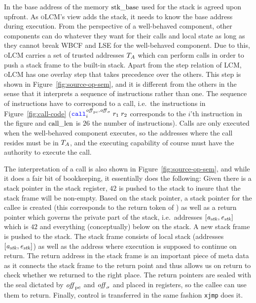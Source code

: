 \documentclass[acmsmall,review,anonymous]{acmart}\settopmatter{printfolios=true,printccs=false,printacmref=false}
\newcommand{\trgcm}{\textsc{LCM}}
\newcommand{\srccm}{\textsc{oLCM}}
\begin{document}
In \stktokens{} the base address of the memory $\mathrm{stk\_base}$ used for the stack is agreed upon upfront.
As \srccm{}'s view adds the stack, it needs to know the base address during execution.
From the perspective of a well-behaved component, other components can do whatever they want for their calls and local state as long as they cannot break WBCF and LSE for the well-behaved component.
Due to this, \srccm{} carries a set of trusted addresses $T_{A}$ which can perform calls in order to push a stack frame to the built-in stack.
Apart from the step relation of \trgcm{}, \srccm{} has one overlay step that takes precedence over the others.
This step is shown in Figure~\ref{fig:source-op-sem}, and it is different from the others in the sense that it interprets a sequence of instructions rather than one.
The sequence of instructions have to correspond to a call, i.e.\ the instructions in Figure~\ref{fig:call-code} ($\scall[i]{\offpc,\offsigma}{r_1}{r_2}$ corresponds to the $i$'th instruction in the figure and $\mathrm{call\_len}$ is $26$ the number of instructions).
Calls are only executed when the well-behaved component executes, so the addresses where the call resides must be in $T_{A}$, and the executing capability of course must have the authority to execute the call.

The interpretation of a call is also shown in Figure~\ref{fig:source-op-sem}, and while it does a fair bit of bookkeeping, it essentially does the following: Given there is a stack pointer in the stack register, $42$ is pushed to the stack to insure that the stack frame will be non-empty. Based on the stack pointer, a stack pointer for the callee is created (this corresponds to the return token of \stktokens{}) as well as a return pointer which governs the private part of the stack, i.e.\ addresses $[\mathit{a}_{\mathit{stk}},\mathit{e}_{\mathit{stk}}]$ which is $42$ and everything (conceptually) below on the stack. A new stack frame is pushed to the stack. The stack frame consists of local stack (addresses $[\mathit{a}_{\mathit{stk}},\mathit{e}_{\mathit{stk}}]$) as well as the address where execution is supposed to continue on return. The return address in the stack frame is an important piece of meta data as it connects the stack frame to the return point and thus allows us on return to check whether we returned to the right place. The return pointers are sealed with the seal dictated by $\mathit{off}_{\mathrm{pc}}$ and $\mathit{off}_\sigma$ and placed in registers, so the callee can use them to return. Finally, control is transferred in the same fashion \texttt{xjmp} does it.
\end{document}
